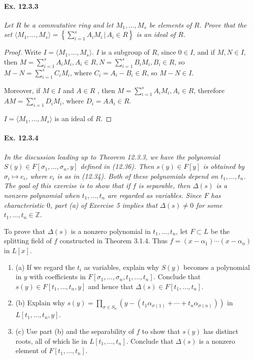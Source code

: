 \documentclass[11pt,a4paper]{article}
\newcommand{\be} {\begin{enumerate}}
\newcommand{\ee} {\end{enumerate}}
\newcommand{\Z}{\mathbb{Z}}
\begin{document}
\paragraph{Ex. 12.3.3}

{\it Let $R$ be a commutative ring and let $M_1,\ldots,M_s$ be elements of $R$. Prove that the set $\langle M_1,\ldots,M_s\rangle = \left\{ \sum_{i=1}^s A_iM_i \, \vert\,  A_i \in R\right\}$ is an ideal of $R$.
}

\begin{proof}
Write $I = \langle M_1,\ldots,M_s\rangle$. $I$ is a subgroup of $R$, since $0 \in I$, and if $M,N \in I$, then $M = \sum_{i=1}^s A_iM_i, A_i \in R, N = \sum_{i=1}^s B_iM_i, B_i \in R$, so $M - N = \sum_{i=1}^s C_iM_i$, where $C_i = A_i - B_i \in R$, so $M - N \in I$.

Moreover, if $M \in I$ and $A \in R$ , then $M = \sum_{i=1}^s A_iM_i, A_i \in R$, therefore $AM  = \sum_{i=1}^s D_iM_i$, where $D_i = AA_i \in R$.

$I =  \langle M_1,\ldots,M_s\rangle$ is an ideal of $R$.
\end{proof}

\paragraph{Ex. 12.3.4}

{\it In the discussion leading up to Theorem 12.3.3, we have the polynomial $S(y) \in F[\sigma_1,\ldots,\sigma_n,y]$ defined in (12.36). Then $s(y) \in F[y]$ is obtained by $\sigma_i \mapsto c_i$, where $c_i$ is as in (12.34). Both of these polynomials depend on $t_1,\ldots,t_n$. The goal of this exercise is to show that if $f$ is separable, then $\Delta(s)$ is a nonzero polynomial when $t_1,\ldots,t_n$ are regarded as variables. Since $F$ has characteristic $0$, part (a) of Exercise 5 implies that $\Delta(s) \ne 0$ for some $t_1,\ldots,t_n \in \Z$.

To prove that $\Delta(s)$ is a nonzero polynomial in $t_1,\ldots,t_n$, let $F \subset L$ be the splitting field of $f$ constructed in Theorem 3.1.4. Thus $f = (x-\alpha_1)\cdots(x-\alpha_n)$ in $L[x]$.
\be
\item[(a)] If we regard the $t_i$ as variables, explain why $S(y)$ becomes a polynomial in $y$ with coefficients in $F[\sigma_1,\ldots,\sigma_n,t_1,\ldots,t_n]$. Conclude that $s(y) \in F[t_1,\ldots,t_n,y]$ and hence that $\Delta(s) \in F[t_1,\ldots, t_n]$.

\item[(b)] Explain why $s(y) = \prod_{\sigma \in S_n} \left(y- (t_1\alpha_{\sigma(1)} + \cdots + t_n \alpha_{\sigma(n)}) \right)$ in $L[t_1,\ldots,t_n,y]$.

\item[(c)] Use part (b) and the separability of $f$ to show that $s(y)$ has distinct roots, all of which lie in $L[t_1,\ldots,t_n]$. Conclude that $\Delta(s)$ is a nonzero element of $F[t_1,\ldots,t_n]$.
\ee
}
\end{document}
